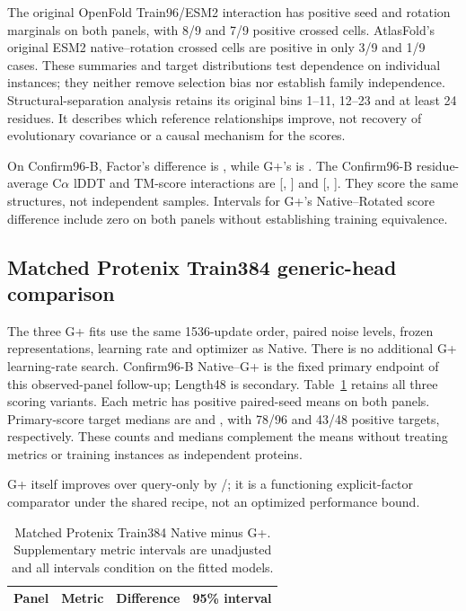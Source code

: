 The original OpenFold Train96/ESM2 interaction has positive seed and rotation
marginals on both panels, with 8/9 and 7/9 positive crossed cells. AtlasFold's original ESM2
native--rotation crossed cells are positive in only 3/9 and 1/9 cases. These
summaries and target distributions test dependence on individual instances;
they neither remove selection bias nor establish family independence.
Structural-separation analysis retains its original bins 1--11, 12--23 and
at least 24 residues. It describes which reference relationships improve,
not recovery of evolutionary covariance or a causal mechanism for the scores.

On Confirm96-B, Factor's difference is ,
while G+'s is .
The Confirm96-B residue-average C$\alpha$ lDDT and TM-score interactions are
[, ]
and 
[, ].
They score the same structures, not independent samples. Intervals for G+'s
Native--Rotated score difference include zero on both panels without establishing
training equivalence.

\subsection{Matched Protenix Train384 generic-head comparison}
\label{app:protenix_gplus}
The three G+ fits use the same 1536-update order, paired noise levels, frozen
representations, learning rate and optimizer as Native. There is no additional
G+ learning-rate search. Confirm96-B Native--G+ is the fixed primary endpoint
of this observed-panel follow-up; Length48 is secondary. Table~\ref{tab:pt_gplus_all}
retains all three scoring variants. Each metric has positive paired-seed means
on both panels. Primary-score target medians are 
and , with 78/96 and 43/48 positive targets,
respectively. These counts and medians complement the means without treating
metrics or training instances as independent proteins.

G+ itself improves over query-only by
/; it is a functioning
explicit-factor comparator under the shared recipe, not an optimized
performance bound.

\begin{table}[h]
\caption{Matched Protenix Train384 Native minus G+. Supplementary metric
intervals are unadjusted and all intervals condition on the fitted models.}
\label{tab:pt_gplus_all}\centering\small
\begin{tabular}{llrr}\toprule
Panel & Metric & Difference & 95\% interval \\\midrule

\end{tabular}
\end{table}

